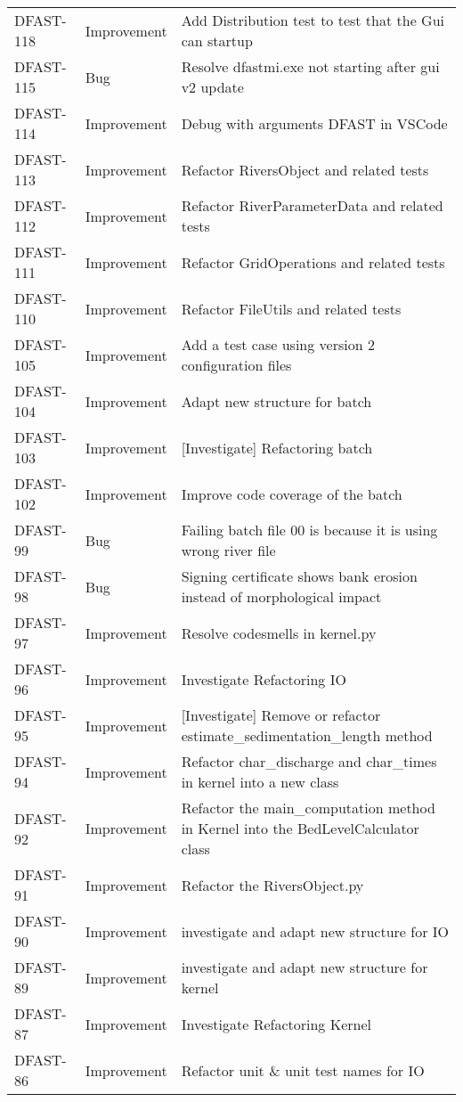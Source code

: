 \documentclass[git]{deltares_manual}
\begin{document}
\begin{longtable}{l|l|p{8cm}}
DFAST-118 & Improvement & Add Distribution test to test that the Gui can startup \\
DFAST-115 & Bug & Resolve dfastmi.exe not starting after gui v2 update \\
DFAST-114 & Improvement & Debug with arguments DFAST in VSCode \\
DFAST-113 & Improvement & Refactor RiversObject and related tests \\
DFAST-112 & Improvement & Refactor RiverParameterData and related tests \\
DFAST-111 & Improvement & Refactor GridOperations and related tests \\
DFAST-110 & Improvement & Refactor FileUtils and related tests \\
DFAST-105 & Improvement & Add a test case using version 2 configuration files \\
DFAST-104 & Improvement & Adapt new structure for batch \\
DFAST-103 & Improvement & [Investigate] Refactoring batch \\
DFAST-102 & Improvement & Improve code coverage of the batch \\
DFAST-99 & Bug & Failing batch file 00 is because it is using wrong river file \\
DFAST-98 & Bug & Signing certificate shows bank erosion instead of morphological impact \\
DFAST-97 & Improvement & Resolve codesmells in kernel.py \\
DFAST-96 & Improvement & Investigate Refactoring IO \\
DFAST-95 & Improvement & [Investigate] Remove or refactor estimate\_sedimentation\_length method \\
DFAST-94 & Improvement & Refactor char\_discharge and char\_times in kernel into a new class \\
DFAST-92 & Improvement & Refactor the main\_computation method in Kernel into the BedLevelCalculator class \\
DFAST-91 & Improvement & Refactor the RiversObject.py \\
DFAST-90 & Improvement & investigate and adapt new structure for IO \\
DFAST-89 & Improvement & investigate and adapt new structure for kernel \\
DFAST-87 & Improvement & Investigate Refactoring Kernel \\
DFAST-86 & Improvement & Refactor unit \& unit test names for IO \\

\end{longtable}
\end{document}

